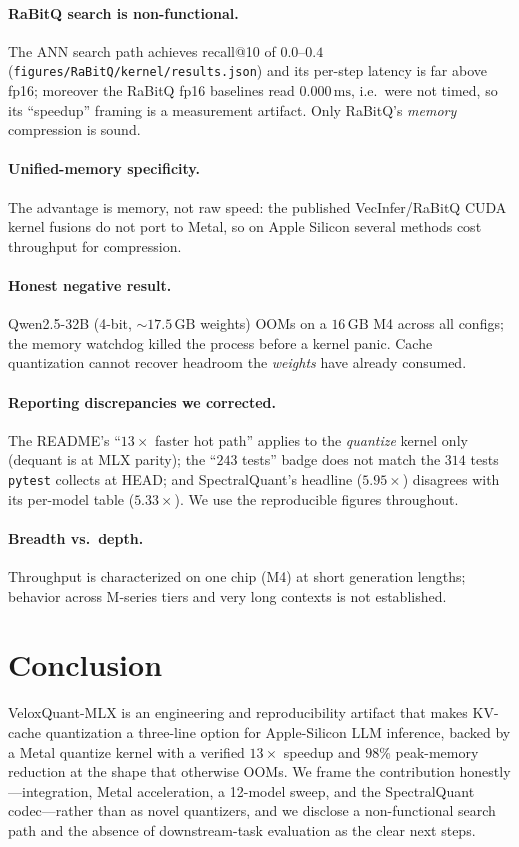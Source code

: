 \documentclass[11pt]{article}
\begin{document}
\paragraph{RaBitQ search is non-functional.} The ANN search path achieves
recall@10 of $0.0$--$0.4$ (\texttt{figures/RaBitQ/kernel/results.json}) and its
per-step latency is far above fp16; moreover the RaBitQ fp16 baselines read
$0.000\,\mathrm{ms}$, i.e.\ were not timed, so its ``speedup'' framing is a
measurement artifact. Only RaBitQ's \emph{memory} compression is sound.

\paragraph{Unified-memory specificity.} The advantage is memory, not raw
speed: the published VecInfer/RaBitQ CUDA kernel fusions do not port to Metal,
so on Apple Silicon several methods cost throughput for compression.

\paragraph{Honest negative result.} Qwen2.5-32B (4-bit, $\sim\!17.5\,\mathrm{GB}$
weights) OOMs on a $16\,\mathrm{GB}$ M4 across all configs; the memory
watchdog killed the process before a kernel panic. Cache quantization cannot
recover headroom the \emph{weights} have already consumed.

\paragraph{Reporting discrepancies we corrected.} The README's
``$13\times$ faster hot path'' applies to the \emph{quantize} kernel only
(dequant is at MLX parity); the ``$243$ tests'' badge does not match the
$314$ tests \texttt{pytest} collects at HEAD; and SpectralQuant's headline
($5.95\times$) disagrees with its per-model table ($5.33\times$). We use the
reproducible figures throughout.

\paragraph{Breadth vs.\ depth.} Throughput is characterized on one chip (M4)
at short generation lengths; behavior across M-series tiers and very long
contexts is not established.

\section{Conclusion}
VeloxQuant-MLX is an engineering and reproducibility artifact that makes
KV-cache quantization a three-line option for Apple-Silicon LLM inference,
backed by a Metal quantize kernel with a verified $13\times$ speedup and
$98\%$ peak-memory reduction at the shape that otherwise OOMs. We frame the
contribution honestly---integration, Metal acceleration, a 12-model sweep, and
the SpectralQuant codec---rather than as novel quantizers, and we disclose a
non-functional search path and the absence of downstream-task evaluation as
the clear next steps.
\end{document}
